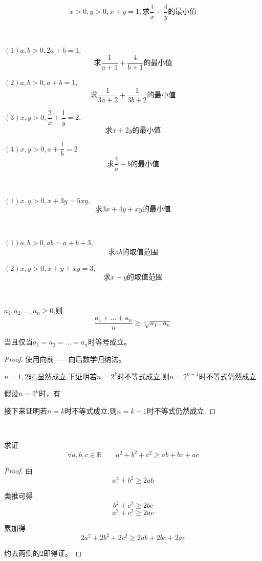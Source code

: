 \begin{example}
    \[x>0,y>0,x+y=1,\text{求}\frac{1}{x}+\frac{4}{y}\text{的最小值}\]
\end{example}
\begin{jie}
    
\end{jie}
\begin{example}
    \ 

    $(1)a,b>0,2a+b=1,$
    \[\text{求}\frac{1}{a+1}+\frac{4}{b+1}\text{的最小值}\]

    $(2)a,b>0,a+b=1,$
    \[\text{求}\frac{1}{3a+2}+\frac{1}{3b+2}\text{的最小值}\]

    $(3)x,y>0,\dfrac{2}{x}+\dfrac{1}{y}=2,$
    \[\text{求}x+2y\text{的最小值}\]

    $(4)x,y>0,a+\dfrac{1}{b}=2$
    \[\text{求}\frac{4}{a}+b\text{的最小值}\]
\end{example}
\begin{exercise}
    \ 

    $(1)x,y>0,x+3y=5xy,$\[\text{求}3x+4y+xy\text{的最小值}\]
\end{exercise}
\begin{example}
    \ 

    $(1)a,b>0,ab=a+b+3,$
    \[\text{求}ab\text{的取值范围}\]

    $(2)x,y>0,x+y+xy=3,$
    \[\text{求}x+y\text{的取值范围}\]
\end{example}
\begin{theorem}[n元均值不等式]
    \ 

    $a_1,a_2,\dots,a_n\geq0$,则
    \[\frac{a_1+\dots+a_n}{n}\geq\sqrt[n]{a_1 \dots a_n}\]
    
    当且仅当$a_1=a_2=\dots=a_n$时等号成立。
\end{theorem}
\begin{proof}
    使用向前——向后数学归纳法。
    
    $n=1,2$时,显然成立.下证明若$n=2^k$时不等式成立,则$n=2^{n+1}$时不等式仍然成立.

    假设$n=2^k$时，有\[\]

    接下来证明若$n=k$时不等式成立,则$n=k-1$时不等式仍然成立.
\end{proof}
\begin{example}
    \ 

    求证
    \[\forall a,b,c\in \mathbb{R}\qquad a^2+b^2+c^2\geq ab+bc+ac\]
\end{example}
\begin{proof}
    由\[a^2+b^2\geq 2ab\]
    
    类推可得\[b^2+c^2\geq 2bc\]\[a^2+c^2\geq 2ac\]

    累加得\[2a^2+2b^2+2c^2\geq 2ab+2bc+2ac\]

    约去两侧的$2$即得证。
\end{proof}
